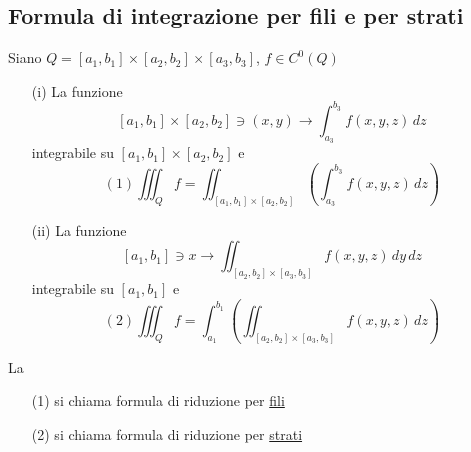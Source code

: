 \subsection{Formula di integrazione per fili e per strati}
\begin{theorem}
  Siano $Q = [a_1,b_1]\times [a_2,b_2]\times [a_3,b_3]$, $f \in C^0(Q)$
  \begin{enumerate}
    \item[(i)] La funzione $$[a_1,b_1]\times [a_2,b_2] \ni (x,y) \to \int_{a_3}^{b_3} f(x,y,z) \,dz$$
              \ace integrabile su $[a_1,b_1]\times [a_2,b_2]$ e 
              $$(1) \iiint_{Q} f = \iint_{[a_1,b_1]\times [a_2,b_2]} \left(\int_{a_3}^{b_3} f(x,y,z) \,dz\right)$$
    \item[(ii)] La funzione $$[a_1,b_1] \ni x \to \iint_{[a_2,b_2]\times [a_3,b_3]} f(x,y,z) \,dy\,dz$$
                \ace integrabile su $[a_1,b_1]$ e 
                $$(2) \iiint_{Q} f = \int_{a_1}^{b_1} \left(\iint_{[a_2,b_2]\times[a_3,b_3]} f(x,y,z) \,dz\right)$$
  \end{enumerate}
  La \begin{itemize}
    \item[(1)] si chiama formula di riduzione per \underline{fili}
    \item[(2)] si chiama formula di riduzione per \underline{strati}
  \end{itemize}
\end{theorem}